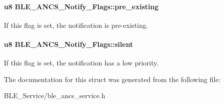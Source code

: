 \paragraph[{\texorpdfstring{pre\+\_\+existing}{pre_existing}}]{\setlength{\rightskip}{0pt plus 5cm}u8 B\+L\+E\+\_\+\+A\+N\+C\+S\+\_\+\+Notify\+\_\+\+Flags\+::pre\+\_\+existing}\hypertarget{struct_b_l_e___a_n_c_s___notify___flags_a681600a1c4c544ee801e86b8045ba684}{}\label{struct_b_l_e___a_n_c_s___notify___flags_a681600a1c4c544ee801e86b8045ba684}
If this flag is set, the notification is pre-\/existing. 
\paragraph[{\texorpdfstring{silent}{silent}}]{\setlength{\rightskip}{0pt plus 5cm}u8 B\+L\+E\+\_\+\+A\+N\+C\+S\+\_\+\+Notify\+\_\+\+Flags\+::silent}\hypertarget{struct_b_l_e___a_n_c_s___notify___flags_a1b8ada6c761d65c2a837c1ea321c5751}{}\label{struct_b_l_e___a_n_c_s___notify___flags_a1b8ada6c761d65c2a837c1ea321c5751}
If this flag is set, the notification has a low priority. 

The documentation for this struct was generated from the following file\+:\begin{DoxyCompactItemize}
\item 
B\+L\+E\+\_\+\+Service/ble\+\_\+ancs\+\_\+service.\+h\end{DoxyCompactItemize}
